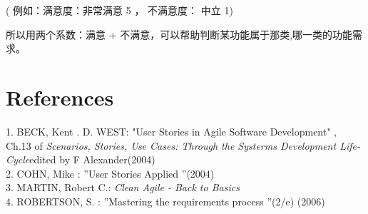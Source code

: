 ( 例如：满意度：非常满意 5 ， 不满意度： 中立 1)

所以用两个系数：满意 +
不满意，可以帮助判断某功能属于那类,哪一类的功能需求。

\hypertarget{references}{%
\section{References}\label{references}}

1. BECK, Kent . D. WEST: "User Stories in Agile Software Development" ,
Ch.13 of \emph{Scenarios, Stories, Use Cases: Through the Systerms
Development Life-Cycle}edited by F Alexander(2004)\\
2. COHN, Mike : ''User Stories Applied ''(2004)\\
3. MARTIN, Robert C.: \emph{Clean Agile - Back to Basics}\\
4. ROBERTSON, S. : ''Mastering the requirements process ''(2/e) (2006)\\



